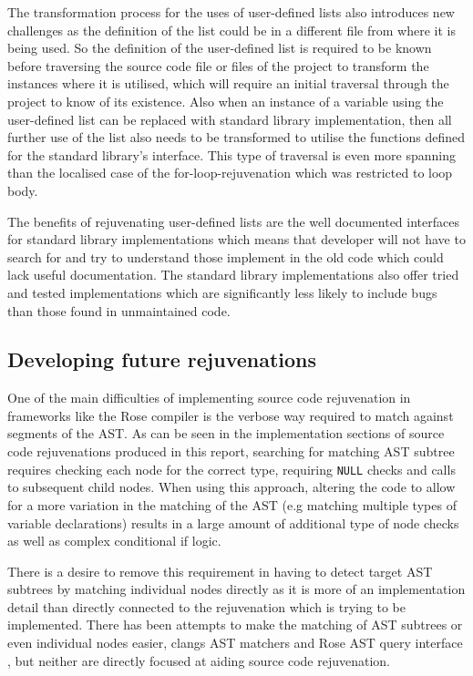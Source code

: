 \documentclass[bsc,frontabs,singlespacing,twoside,parskip,deptreport]{infthesis}
\begin{document}
The transformation process for the uses of user-defined lists also introduces new challenges as the definition of the list could be in a different file from where it is being used. So the definition of the user-defined list is required to be known before traversing the source code file or files of the project to transform the instances where it is utilised, which will require an initial traversal through the project to know of its existence. Also when an instance of a variable using the user-defined list can be replaced with standard library implementation, then all further use of the list also needs to be transformed to utilise the functions defined for the standard library's interface. This type of traversal is even more spanning than the localised case of the for-loop-rejuvenation which was restricted to loop body.

The benefits of rejuvenating user-defined lists are the well documented interfaces for standard library implementations which means that developer will not have to search for and try to understand those implement in the old code which could lack useful documentation. The standard library implementations also offer tried and tested implementations which are significantly less likely to include bugs than those found in unmaintained code.


\subsection{Developing future rejuvenations}
One of the main difficulties of implementing source code rejuvenation in frameworks like the Rose compiler is the verbose way required to match against segments of the AST. As can be seen in the implementation sections of source code rejuvenations produced in this report, searching for matching AST subtree requires checking each node for the correct type, requiring \texttt{NULL} checks and calls to subsequent child nodes. When using this approach, altering the code to allow for a more variation in the matching of the AST (e.g matching multiple types of variable declarations) results in a large amount of additional type of node checks as well as complex conditional if logic. 

There is a desire to remove this requirement in having to detect target AST subtrees by matching individual nodes directly as it is more of an implementation detail than directly connected to the rejuvenation which is trying to be implemented. There has been attempts to make the matching of AST subtrees or even individual nodes easier, clangs AST matchers \cite{} and Rose AST query interface \cite{}, but neither are directly focused at aiding source code rejuvenation. 
\end{document}
